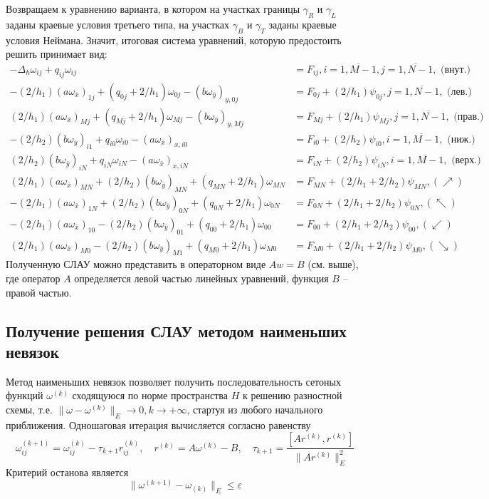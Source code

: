 \documentclass{article}
\begin{document}
Возвращаем к уравнению варианта, в котором на участках границы $\gamma_R$ и $\gamma_L$ заданы краевые условия третьего типа, на участках $\gamma_{B}$ и $\gamma_{T}$ заданы краевые условия Неймана. Значит, итоговая система уравнений, которую предостоить решить принимает вид:
\begin{equation*}
\begin{aligned}
    -\Delta_h \omega_{ij} + q_{ij}\omega_{ij} &= F_{ij}, i=\overline{1,M-1}, j=\overline{1,N-1},\text{ (внут.)} \\
    -(2/h_1)(a\omega_{\bar{x}})_{1j} + (q_{0j}+2/h_1)\omega_{0j} - (b\omega_{\bar{y}})_{y,0j} &= F_{0j}+(2/h_1)\psi_{0j}, j=\overline{1,N-1},\text{ (лев.)}\\
    (2/h_1)(a\omega_{\bar{x}})_{Mj} + (q_{Mj}+2/h_1)\omega_{Mj} - (b\omega_{\bar{y}})_{y,Mj} &= F_{Mj}+(2/h_1)\psi_{Mj}, j=\overline{1,N-1},\text{ (прав.)}\\
    -(2/h_2)(b\omega_{\bar{y}})_{i1}+q_{i0}\omega_{i0}-(a\omega_{\bar{x}})_{x,i0} &= F_{i0}+(2/h_2)\psi_{i0}, i=\overline{1,M-1},\text{ (ниж.)}\\
    (2/h_2)(b\omega_{\bar{y}})_{iN}+q_{iN}\omega_{iN}-(a\omega_{\bar{x}})_{x,iN} &= F_{iN}+(2/h_2)\psi_{iN}, i=\overline{1,M-1},\text{ (верх.)}\\
    (2/h_1)(a\omega_{\bar{x}})_{MN}+(2/h_2)(b\omega_{\bar{y}})_{MN} + (q_{MN}+2/h_1)\omega_{MN} &= F_{MN} + (2/h_1+2/h_2)\psi_{MN}, (\nearrow)\\
    -(2/h_1)(a\omega_{\bar{x}})_{1N}+(2/h_2)(b\omega_{\bar{y}})_{0N} + (q_{0N}+2/h_1)\omega_{0N} &= F_{0N} + (2/h_1+2/h_2)\psi_{0N}, (\nwarrow )\\
    -(2/h_1)(a\omega_{\bar{x}})_{10}-(2/h_2)(b\omega_{\bar{y}})_{01} + (q_{00}+2/h_1)\omega_{00} &= F_{00} + (2/h_1+2/h_2)\psi_{00}, (\swarrow )\\
    (2/h_1)(a\omega_{\bar{x}})_{M0}-(2/h_2)(b\omega_{\bar{y}})_{M1} + (q_{M0}+2/h_1)\omega_{M0} &= F_{M0} + (2/h_1+2/h_2)\psi_{M0}, (\searrow)
\end{aligned}
\end{equation*}
Полученную СЛАУ можно представить в операторном виде $Aw=B$ (см. выше), где оператор $A$ определяется левой частью линейных уравнений, функция $B$ – правой частью.

\subsection{Получение решения СЛАУ методом наименьших невязок}
Метод наименьших невязок позволяет получить последовательность сетоных функций $\omega^{(k)}$ сходящуюся по норме пространства $H$ к решению разностной схемы, т.е. $\|\omega-\omega^{(k)}\|_E \to 0,k\to+\infty$, стартуя из любого начального приближения. Одношаговая итерация вычисляется согласно равенству
\begin{equation*}
    \omega_{ij}^{(k+1)} = \omega_{ij}^{(k)} - \tau_{k+1}r_{ij}^{(k)},\quad r^{(k)} = A\omega^{(k)}-B,\quad\tau_{k+1} = \frac{[Ar^{(k)},r^{(k)}]}{\|Ar^{(k)}\|^2_E}
\end{equation*}
Критерий останова является 
\begin{equation*}
    \|\omega^{(k+1)} - \omega_{(k)}\|_E \leqslant \varepsilon
\end{equation*}
\end{document}
